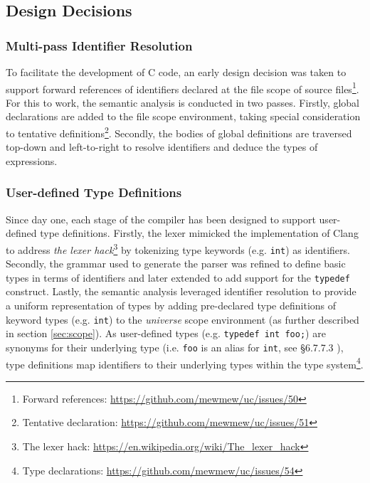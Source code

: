 \subsection{Design Decisions}

%

\subsubsection{Multi-pass Identifier Resolution}

To facilitate the development of C code, an early design decision was taken to support forward references of identifiers declared at the file scope of source files\footnote{Forward references: \url{https://github.com/mewmew/uc/issues/50}}. For this to work, the semantic analysis is conducted in two passes. Firstly, global declarations are added to the file scope environment, taking special consideration to tentative definitions\footnote{Tentative declaration: \url{https://github.com/mewmew/uc/issues/51}}. Secondly, the bodies of global definitions are traversed top-down and left-to-right to resolve identifiers and deduce the types of expressions.

\subsubsection{User-defined Type Definitions}

Since day one, each stage of the compiler has been designed to support user-defined type definitions. Firstly, the lexer mimicked the implementation of Clang to address \textit{the lexer hack}\footnote{The lexer hack: \url{https://en.wikipedia.org/wiki/The_lexer_hack}} by tokenizing type keywords (e.g. \texttt{int}) as identifiers. Secondly, the grammar used to generate the parser was refined to define basic types in terms of identifiers and later extended to add support for the \texttt{typedef} construct. Lastly, the semantic analysis leveraged identifier resolution to provide a uniform representation of types by adding pre-declared type definitions of keyword types (e.g. \texttt{int}) to the \textit{universe} scope environment (as further described in section \ref{sec:scope}). As user-defined types (e.g. \texttt{typedef int foo;}) are synonyms for their underlying type (i.e. \texttt{foo} is an alias for \texttt{int}, see §6.7.7.3 \cite{c11_spec}), type definitions map identifiers to their underlying types within the type system\footnote{Type declarations: \url{https://github.com/mewmew/uc/issues/54}}.

